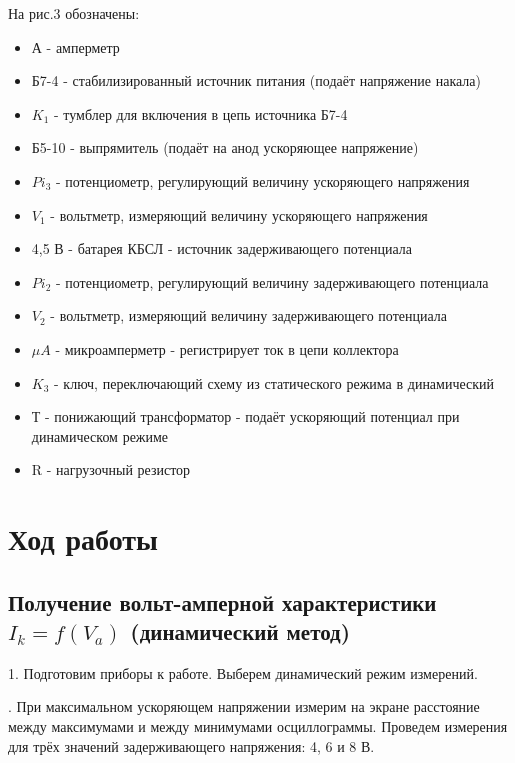 \documentclass[a4paper,12pt]{article} %
\begin{document}
На рис.3 обозначены:
\begin{itemize}
    \item А - амперметр
    \item Б7-4 - стабилизированный источник питания (подаёт напряжение накала)
    \item $K_1$ - тумблер для включения в цепь источника Б7-4
    \item Б5-10 - выпрямитель (подаёт на анод ускоряющее напряжение)
    \item $Pi_3$ - потенциометр, регулирующий величину ускоряющего напряжения
    \item $V_1$ - вольтметр, измеряющий величину ускоряющего напряжения
    \item 4,5 В - батарея КБСЛ - источник задерживающего потенциала
    \item $Pi_2$ - потенциометр, регулирующий величину задерживающего потенциала
    \item $V_2$ - вольтметр, измеряющий величину задерживающего потенциала
    \item $\mu A$ - микроамперметр - регистрирует ток в цепи коллектора
    \item $K_3$ - ключ, переключающий схему из статического режима в динамический
    \item Т - понижающий трансформатор - подаёт ускоряющий потенциал при динамическом режиме
    \item R - нагрузочный резистор
\end{itemize}


\section{Ход работы}
\subsection{Получение вольт-амперной характеристики $I_k = f(V_a)$ (динамический метод)}

1. Подготовим приборы к работе. Выберем динамический режим измерений.

\medskip

. При максимальном ускоряющем напряжении измерим на экране расстояние между максимумами и между минимумами осциллограммы. Проведем измерения для трёх значений задерживающего напряжения: 4, 6 и 8 В.
\end{document}
